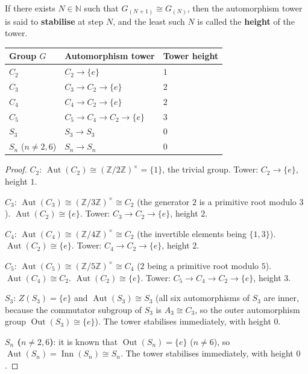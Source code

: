 \begin{definition}\label{def:tower_stability}
If there exists $N\in\mathbb{N}$ such that $G_{(N+1)} \cong G_{(N)}$, then the automorphism tower is said to \textbf{stabilise} at step $N$, and the least such $N$ is called the \textbf{height} of the tower.
\end{definition}

\begin{proposition}\label{prop:tower_heights}
\begin{center}
\begin{tabular}{>{\centering\arraybackslash}p{3cm}>{\centering\arraybackslash}p{5cm}>{\centering\arraybackslash}p{3cm}}
\toprule
Group $G$ & Automorphism tower & Tower height \\
\midrule
$C_2$ & $C_2 \to \{e\}$ & $1$ \\
$C_3$ & $C_3 \to C_2 \to \{e\}$ & $2$ \\
$C_4$ & $C_4 \to C_2 \to \{e\}$ & $2$ \\
$C_5$ & $C_5 \to C_4 \to C_2 \to \{e\}$ & $3$ \\
$S_3$ & $S_3 \to S_3$ & $0$ \\
$S_n$ ($n\neq 2,6$) & $S_n \to S_n$ & $0$ \\
\bottomrule
\end{tabular}
\end{center}
\end{proposition}

\begin{proof}
\textbf{$C_2$}: $\operatorname{Aut}(C_2) \cong (\mathbb{Z}/2\mathbb{Z})^\times = \{1\}$, the trivial group. Tower: $C_2 \to \{e\}$, height $1$.

\textbf{$C_3$}: $\operatorname{Aut}(C_3) \cong (\mathbb{Z}/3\mathbb{Z})^\times \cong C_2$ (the generator $2$ is a primitive root modulo $3$). $\operatorname{Aut}(C_2) \cong \{e\}$. Tower: $C_3 \to C_2 \to \{e\}$, height $2$.

\textbf{$C_4$}: $\operatorname{Aut}(C_4) \cong (\mathbb{Z}/4\mathbb{Z})^\times \cong C_2$ (the invertible elements being $\{1,3\}$). $\operatorname{Aut}(C_2) \cong \{e\}$. Tower: $C_4 \to C_2 \to \{e\}$, height $2$.

\textbf{$C_5$}: $\operatorname{Aut}(C_5) \cong (\mathbb{Z}/5\mathbb{Z})^\times \cong C_4$ ($2$ being a primitive root modulo $5$). $\operatorname{Aut}(C_4) \cong C_2$. $\operatorname{Aut}(C_2) \cong \{e\}$. Tower: $C_5 \to C_4 \to C_2 \to \{e\}$, height $3$.

\textbf{$S_3$}: $Z(S_3) = \{e\}$ and $\operatorname{Aut}(S_3) \cong S_3$ (all six automorphisms of $S_3$ are inner, because the commutator subgroup of $S_3$ is $A_3 \cong C_3$, so the outer automorphism group $\operatorname{Out}(S_3) \cong \{e\}$). The tower stabilises immediately, with height $0$.

\textbf{$S_n$ ($n \neq 2,6$)}: it is known that $\operatorname{Out}(S_n) = \{e\}$ ($n \neq 6$), so $\operatorname{Aut}(S_n) = \operatorname{Inn}(S_n) \cong S_n$. The tower stabilises immediately, with height $0$.
\end{proof}

